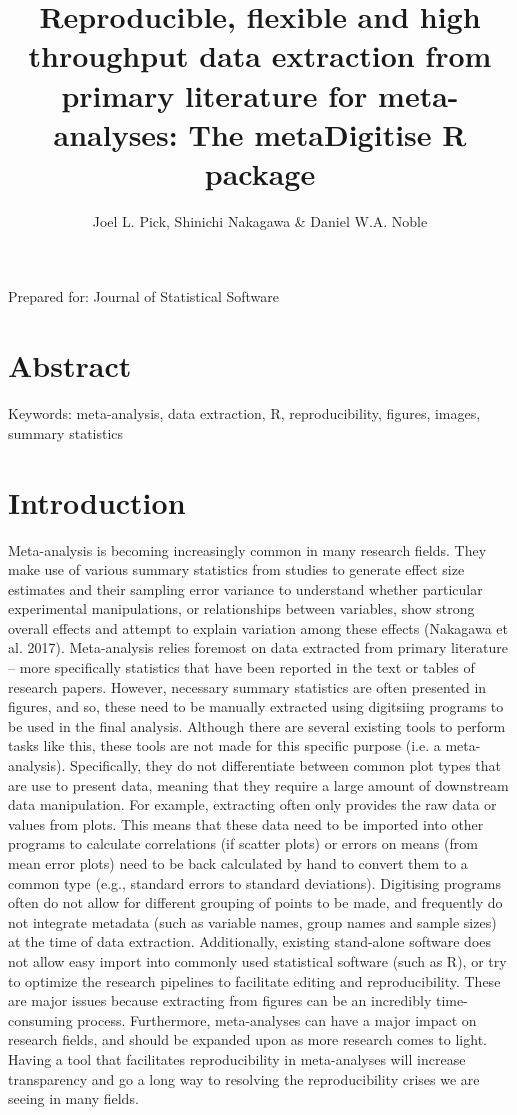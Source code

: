 \documentclass{article}
\title{Reproducible, flexible and high throughput data extraction from primary literature for meta-analyses: The metaDigitise R package}
\author{Joel L. Pick, Shinichi Nakagawa \& Daniel W.A. Noble}
\begin{document}
\doublespacing

\maketitle
Prepared for: Journal of Statistical Software

\section*{Abstract}

Keywords: meta-analysis, data extraction, R, reproducibility, figures, images, summary statistics

\clearpage
\section*{Introduction}

Meta-analysis is becoming increasingly common in many research fields. They make use of various summary statistics from studies to generate effect size estimates and their sampling error variance to understand whether particular experimental manipulations, or relationships between variables, show strong overall effects and attempt to explain variation among these effects (Nakagawa et al. 2017). Meta-analysis relies foremost on data extracted from primary literature – more specifically statistics that have been reported in the text or tables of research papers. However, necessary summary statistics are often presented in figures, and so, these need to be manually extracted using digitsiing programs to be used in the final analysis. Although there are several existing tools to perform tasks like this, these tools are not made for this specific purpose (i.e. a meta-analysis). Specifically, they do not differentiate between common plot types that are use to present data, meaning that they require a large amount of downstream data manipulation. For example, extracting often only provides the raw data or values from plots. This means that these data need to be imported into other programs to calculate correlations (if scatter plots) or errors on means (from mean error plots) need to be back calculated by hand to convert them to a common type (e.g., standard errors to standard deviations). Digitising programs often do not allow for different grouping of points to be made, and frequently do not integrate metadata (such as variable names, group names and sample sizes) at the time of data extraction. Additionally, existing stand-alone software does not allow easy import into commonly used statistical software (such as R), or try to optimize the research pipelines to facilitate editing and reproducibility. These are major issues because extracting from figures can be an incredibly time-consuming process. Furthermore, meta-analyses can have a major impact on research fields, and should be expanded upon as more research comes to light. Having a tool that facilitates reproducibility in meta-analyses will increase transparency and go a long way to resolving the reproducibility crises we are seeing in many fields.
\end{document}
